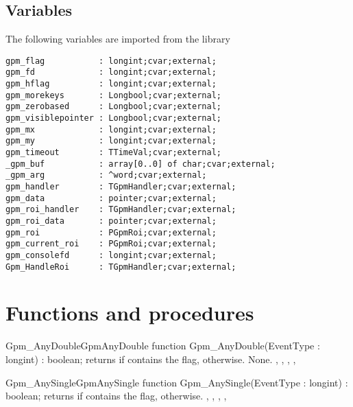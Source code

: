 \subsection{Variables}
The following variables are imported from the  library
\begin{verbatim}
gpm_flag           : longint;cvar;external;
gpm_fd             : longint;cvar;external;
gpm_hflag          : longint;cvar;external;
gpm_morekeys       : Longbool;cvar;external;
gpm_zerobased      : Longbool;cvar;external;
gpm_visiblepointer : Longbool;cvar;external;
gpm_mx             : longint;cvar;external;
gpm_my             : longint;cvar;external;
gpm_timeout        : TTimeVal;cvar;external;
_gpm_buf           : array[0..0] of char;cvar;external;
_gpm_arg           : ^word;cvar;external;
gpm_handler        : TGpmHandler;cvar;external;
gpm_data           : pointer;cvar;external;
gpm_roi_handler    : TGpmHandler;cvar;external;
gpm_roi_data       : pointer;cvar;external;
gpm_roi            : PGpmRoi;cvar;external;
gpm_current_roi    : PGpmRoi;cvar;external;
gpm_consolefd      : longint;cvar;external;
Gpm_HandleRoi      : TGpmHandler;cvar;external;
\end{verbatim}

\section{Functions and procedures}

\begin{functionl}{Gpm\_AnyDouble}{GpmAnyDouble}
\Declaration
function Gpm\_AnyDouble(EventType : longint) : boolean;
\Description
{} returns  if  contains
the  flag,  otherwise.
\Errors
None.
\SeeAlso
{},
,
,
,
\end{functionl}

\begin{functionl}{Gpm\_AnySingle}{GpmAnySingle}
\Declaration
function Gpm\_AnySingle(EventType : longint) : boolean;
\Description
{} returns  if  contains
the  flag,  otherwise. 
\Errors
\SeeAlso
{},
,
,
,
\end{functionl}

